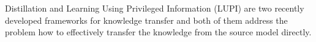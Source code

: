 Distillation \cite{hinton2015distilling} and Learning Using Privileged Information (LUPI) are two recently developed frameworks for knowledge transfer and both of them address the problem how to effectively transfer the knowledge from the source model directly.